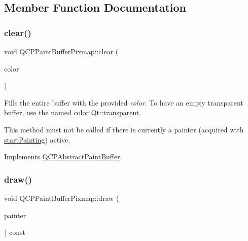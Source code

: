 \subsection{Member Function Documentation}
\mbox{\label{class_q_c_p_paint_buffer_pixmap_a14badbd010a3cde6b55817ccb7b65217}} 
\subsubsection{\texorpdfstring{clear()}{clear()}}
{\footnotesize\ttfamily void Q\+C\+P\+Paint\+Buffer\+Pixmap\+::clear (\begin{DoxyParamCaption}\item[{const Q\+Color \&}]{color }\end{DoxyParamCaption})\hspace{0.3cm}{\ttfamily [virtual]}}

Fills the entire buffer with the provided {\itshape color}. To have an empty transparent buffer, use the named color {\ttfamily Qt\+::transparent}.

This method must not be called if there is currently a painter (acquired with \mbox{\hyperlink{class_q_c_p_paint_buffer_pixmap_a357964ef7d28cfa530338be4e5c93234}{start\+Painting}}) active. 

Implements \mbox{\hyperlink{class_q_c_p_abstract_paint_buffer_a9e253f4541dfc01992b77e8830bd7722}{Q\+C\+P\+Abstract\+Paint\+Buffer}}.

\mbox{\label{class_q_c_p_paint_buffer_pixmap_af7bfc685e56a0a9329e57cd9a265eb74}} 
\subsubsection{\texorpdfstring{draw()}{draw()}}
{\footnotesize\ttfamily void Q\+C\+P\+Paint\+Buffer\+Pixmap\+::draw (\begin{DoxyParamCaption}\item[{\mbox{\hyperlink{class_q_c_p_painter}{Q\+C\+P\+Painter}} $\ast$}]{painter }\end{DoxyParamCaption}) const\hspace{0.3cm}{\ttfamily [virtual]}}

